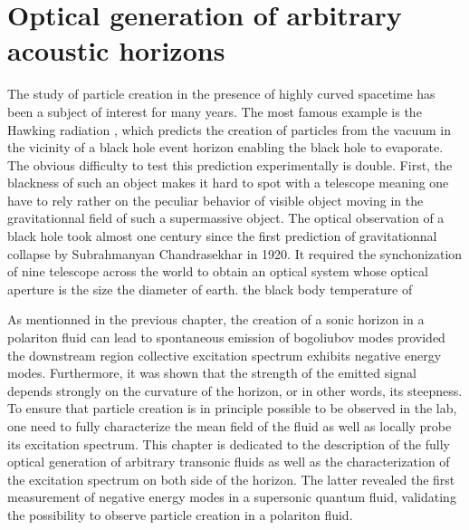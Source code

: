 

\newcommand{\kbf}{\pmb{k}}
\newcommand{\vbf}{\pmb{v}}
\newcommand{\rbf}{\pmb{r}}

\graphicspath{{./}{./fig/}{./chap3_custom_st/fig/}}

\chapter{Optical generation of arbitrary acoustic horizons}

\label{chap:generation_transonic_fluid}

The study of particle creation in the presence of highly curved spacetime has been a subject of interest for many years. The most famous example is the Hawking radiation \cite{hawking_black_1972}, which predicts the creation of particles from the vacuum in the vicinity of a black hole event horizon enabling the black hole 
to evaporate. The obvious difficulty to test this prediction experimentally is double. First, the blackness of such an object makes it hard to spot with a telescope meaning one have to rely rather on the peculiar behavior of visible object moving in the gravitationnal field of such a supermassive object. The optical observation of a black hole took almost one century since the first prediction of gravitationnal collapse by Subrahmanyan Chandrasekhar in 1920. It required 
the synchonization of nine telescope across the world to obtain an optical system whose optical aperture is the size the diameter of earth. the black body temperature of 

As mentionned in the previous chapter, the creation of a sonic horizon in a polariton fluid can lead to spontaneous emission of bogoliubov modes provided the downstream region collective excitation spectrum
exhibits negative energy modes. Furthermore, it was shown that the strength of the emitted signal depends strongly on the curvature of the horizon, or in other words, its steepness. To ensure that particle creation is in principle 
possible to be observed in the lab, one need to fully characterize the mean field of the fluid as well as locally probe its excitation spectrum. This chapter is dedicated to the description of the fully optical generation of arbitrary transonic fluids as well as the characterization of the excitation spectrum on both side of the horizon. 
The latter revealed the first measurement of negative energy modes in a supersonic quantum fluid, validating the possibility to observe particle creation in a polariton fluid.

